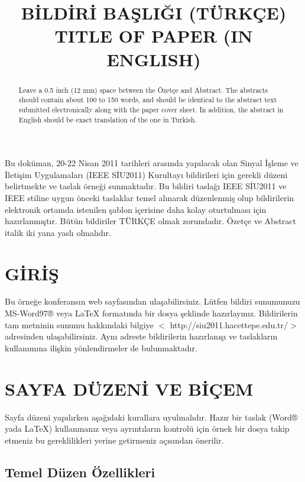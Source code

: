 \documentclass{article}
\title{BİLDİRİ BAŞLIĞI (TÜRKÇE)
\\TITLE OF PAPER (IN ENGLISH)}
\begin{document}
\maketitle
%

\begin{ozetce}
Bu doküman, 20-22 Nisan 2011 tarihleri arasında yapılacak olan Sinyal İşleme ve İletişim Uygulamaları (IEEE SİU2011) Kurultayı bildirileri için gerekli düzeni belirtmekte ve taslak örneği sunmaktadır.  Bu bildiri taslağı IEEE SİU2011 ve  IEEE stiline uygun önceki taslaklar temel alınarak düzenlenmiş olup bildirilerin elektronik ortamda istenilen şablon içerisine daha kolay oturtulması için hazırlanmıştır. Bütün bildiriler TÜRKÇE olmak zorundadır. Özetçe ve Abstract italik iki yana yaslı olmalıdır.
\end{ozetce}


\begin{abstract}
Leave a 0.5 inch (12 mm) space between the Özetçe and Abstract. The abstracts should contain about 100 to 150 words, and should be identical to the abstract text submitted electronically along with the paper cover sheet. In addition, the abstract in English should be exact translation of the one in Turkish.
\end{abstract}


\section{GİRİŞ}

Bu örneğe konferansın web sayfasından ulaşabilirsiniz. Lütfen
bildiri sunumunuzu MS-Word97® veya LaTeX formatında bir dosya
şeklinde hazırlayınız. Bildirilerin tam metninin sunumu hakkındaki
bilgiye $<$ http://siu2011.hacettepe.edu.tr/$>$ adresinden ulaşabilirsiniz.
Aynı adreste bildirilerin hazırlanışı ve taslakların kullanımına
ilişkin yönlendirmeler de bulunmaktadır.

\section{SAYFA DÜZENİ VE BİÇEM}

Sayfa düzeni yapılırken aşağıdaki kurallara uyulmalıdır. Hazır bir
taslak (Word® yada LaTeX) kullanmanız veya ayrıntıların kontrolü
için örnek bir dosya takip etmeniz bu gereklilikleri yerine getirmeniz
açısından önerilir.

\subsection{Temel Düzen Özellikleri}
\end{document}
